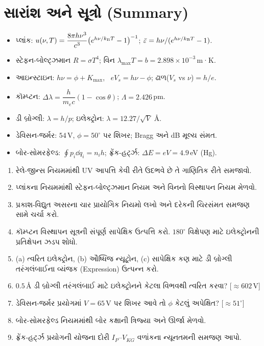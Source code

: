 \section{સારાંશ અને સૂત્રો (Summary)}

\begin{mulmudda}
\begin{itemize}
  \item પ્લાંક: $u(\nu,T)=\dfrac{8\pi h\nu^{3}}{c^{3}}\bigl(e^{h\nu/k_{\mathrm{B}} T}-1\bigr)^{-1}$;
        $\bar\varepsilon=h\nu/(e^{h\nu/k_{\mathrm{B}} T}-1)$.
  \item સ્ટેફન-બોલ્ટ્ઝમાન $R=\sigma T^{4}$; વિન $\lambda_{\max}T=b=2.898\times10^{-3}\,$m·K.
  \item આઇન્સ્ટાઇન: $h\nu=\phi+K_{\max}$, \ $eV_s=h\nu-\phi$; ઢાળ($V_s$ vs $\nu$)$=h/e$.
  \item કૉમ્પ્ટન: $\Delta\lambda=\dfrac{h}{m_ec}(1-\cos\theta)$; $\Lambda=2.426\,$pm.
  \item ડી બ્રોગ્લી: $\lambda=h/p$; ઇલેક્ટ્રોન: $\lambda=12.27/\sqrt{V}$ \AA.
  \item ડેવિસન-જર્મર: $54\,$V, $\phi=50^\circ$ પર શિખર; Bragg અને dB મૂલ્ય સંમત.
  \item બોર-સોમરફેલ્ડ: $\oint p_i\dd q_i=n_ih$; ફ્રેંક-હર્ટ્ઝ: $\Delta E=eV=4.9\,$eV (Hg).
\end{itemize}
\end{mulmudda}

\begin{svadhyay}
\begin{enumerate}
  \item રેલે-જીન્સ નિયમમાંથી UV આપત્તિ કેવી રીતે ઉદભવે છે તે ગાણિતિક રીતે સમજાવો.
  \item પ્લાંકના નિયમમાંથી સ્ટેફન-બોલ્ટ્ઝમાન નિયમ અને વિનનો વિસ્થાપન નિયમ મેળવો.
  \item પ્રકાશ-વિદ્યુત અસરના ચાર પ્રાયોગિક નિયમો લખો અને દરેકની ચિરસંમત સમજણ સામે ચર્ચા કરો.
  \item કૉમ્પ્ટન વિસ્થાપન સૂત્રની સંપૂર્ણ સાપેક્ષિક ઉત્પત્તિ કરો. $180^\circ$ વિક્ષેપણ માટે
        ઇલેક્ટ્રોનની પ્રતિક્ષેપન ઝડપ શોધો.
  \item (a) ત્વરિત ઇલેક્ટ્રોન, (b) ઔષ્ધિજ ન્યૂટ્રોન, (c) સાપેક્ષિક કણ માટે ડી બ્રોગ્લી
        તરંગલંબાઈના વ્યંજક (Expression) ઉત્પન્ન કરો.
  \item $0.5\,\text{\AA}$ ડી બ્રોગ્લી તરંગલંબાઈ માટે ઇલેક્ટ્રોનને કેટલા વિભવથી ત્વરિત કરવા?
        [$\approx602\,$V]
  \item ડેવિસન-જર્મર પ્રયોગમાં $V=65\,$V પર શિખર આવે તો $\phi$ કેટલું અપેક્ષિત?
        [$\approx51^\circ$]
  \item બોર-સોમરફેલ્ડ નિયમમાંથી બોર કક્ષાની ત્રિજ્યા અને ઊર્જા મેળવો.
  \item ફ્રેંક-હર્ટ્ઝ પ્રયોગની યોજના દોરી $I_P$--$V_{KG}$ વળાંકના ન્યૂનતમની સમજણ આપો.
\end{enumerate}
\end{svadhyay}

